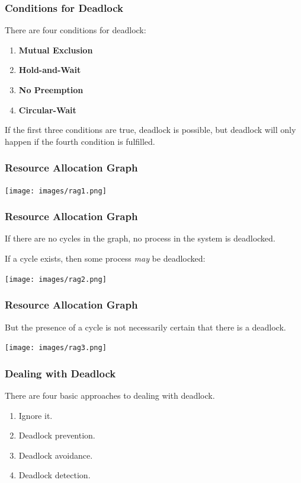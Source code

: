 \begin{frame}
	\frametitle{Conditions for Deadlock}
	There are four conditions for deadlock:

	\begin{enumerate}
		\item \textbf{Mutual Exclusion}
		\item \textbf{Hold-and-Wait}
		\item \textbf{No Preemption}
		\item \textbf{Circular-Wait}
	\end{enumerate}


	If the first three conditions are true, deadlock is possible, but deadlock will only happen if the fourth condition is fulfilled.


\end{frame}

\begin{frame}
	\frametitle{Resource Allocation Graph}

	\begin{center}
		\texttt{[image: images/rag1.png]}
	\end{center}

\end{frame}

\begin{frame}
	\frametitle{Resource Allocation Graph}

	If there are no cycles in the graph, no process in the system is deadlocked.

	If a cycle exists, then some process \textit{may} be deadlocked:

	\begin{center}
		\texttt{[image: images/rag2.png]}
	\end{center}

\end{frame}

\begin{frame}
	\frametitle{Resource Allocation Graph}

	But the presence of a cycle is not necessarily certain that there is a deadlock.

	\begin{center}
		\texttt{[image: images/rag3.png]}
	\end{center}


\end{frame}

\begin{frame}
	\frametitle{Dealing with Deadlock}

	There are four basic approaches to dealing with deadlock.

	\begin{enumerate}
		\item Ignore it.
		\item Deadlock prevention.
		\item Deadlock avoidance.
		\item Deadlock detection.
	\end{enumerate}

\end{frame}


